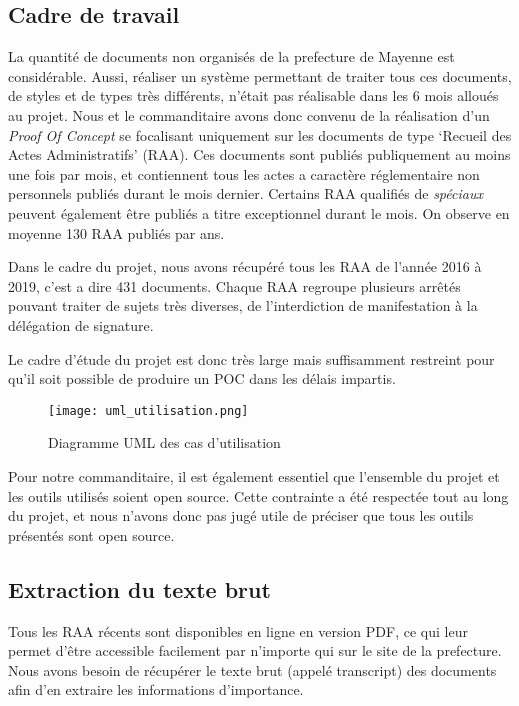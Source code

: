 
\subsection{Cadre de travail}
La quantité de documents non organisés de la prefecture de Mayenne est considérable.
Aussi, réaliser un système permettant de traiter tous ces documents, de styles et de types très différents, n'était pas réalisable dans les 6 mois alloués au projet.
Nous et le commanditaire avons donc convenu de la réalisation d'un \textit{Proof Of Concept} se focalisant uniquement sur les documents de type `Recueil des Actes Administratifs' (RAA).
Ces documents sont publiés publiquement au moins une fois par mois, et contiennent tous les actes a caractère réglementaire non personnels publiés durant le mois dernier.
Certains RAA qualifiés de \textit{spéciaux} peuvent également être publiés a titre exceptionnel durant le mois.
On observe en moyenne 130 RAA publiés par ans.

Dans le cadre du projet, nous avons récupéré tous les RAA de l'année 2016 à 2019, c'est a dire 431 documents.
Chaque RAA regroupe plusieurs arrêtés pouvant traiter de sujets très diverses, de l'interdiction de manifestation à la délégation de signature.

Le cadre d'étude du projet est donc très large mais suffisamment restreint pour qu'il soit possible de produire un POC dans les délais impartis. 

\begin{figure}[h!]
  \centering
  \texttt{[image: uml\_utilisation.png]}
	\caption[]{Diagramme UML des cas d'utilisation}
	\label{fig:umlUtilisation}
\end{figure}

Pour notre commanditaire, il est également essentiel que l'ensemble du projet et les outils utilisés soient open source.
Cette contrainte a été respectée tout au long du projet, et nous n'avons donc pas jugé utile de préciser que tous les outils présentés sont open source.

\subsection{Extraction du texte brut}
Tous les RAA récents sont disponibles en ligne en version PDF, ce qui leur permet d'être accessible facilement par n'importe qui sur le site de la prefecture.
Nous avons besoin de récupérer le texte brut (appelé transcript) des documents afin d'en extraire les informations d'importance.

